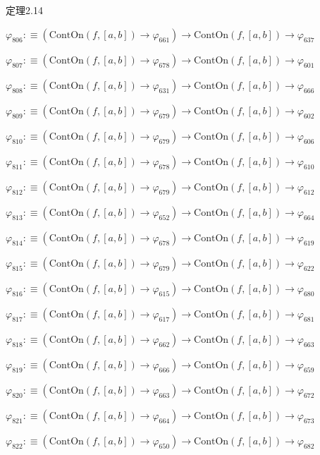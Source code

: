 \begin{fullproof}{定理2.14}
\begin{abbrevlist}
\item $\varphi_{806} :\equiv (\mathrm{ContOn}(f,[a,b]) \to \varphi_{661}) \to \mathrm{ContOn}(f,[a,b]) \to \varphi_{637}$
\item $\varphi_{807} :\equiv (\mathrm{ContOn}(f,[a,b]) \to \varphi_{678}) \to \mathrm{ContOn}(f,[a,b]) \to \varphi_{601}$
\item $\varphi_{808} :\equiv (\mathrm{ContOn}(f,[a,b]) \to \varphi_{631}) \to \mathrm{ContOn}(f,[a,b]) \to \varphi_{666}$
\item $\varphi_{809} :\equiv (\mathrm{ContOn}(f,[a,b]) \to \varphi_{679}) \to \mathrm{ContOn}(f,[a,b]) \to \varphi_{602}$
\item $\varphi_{810} :\equiv (\mathrm{ContOn}(f,[a,b]) \to \varphi_{679}) \to \mathrm{ContOn}(f,[a,b]) \to \varphi_{606}$
\item $\varphi_{811} :\equiv (\mathrm{ContOn}(f,[a,b]) \to \varphi_{678}) \to \mathrm{ContOn}(f,[a,b]) \to \varphi_{610}$
\item $\varphi_{812} :\equiv (\mathrm{ContOn}(f,[a,b]) \to \varphi_{679}) \to \mathrm{ContOn}(f,[a,b]) \to \varphi_{612}$
\item $\varphi_{813} :\equiv (\mathrm{ContOn}(f,[a,b]) \to \varphi_{652}) \to \mathrm{ContOn}(f,[a,b]) \to \varphi_{664}$
\item $\varphi_{814} :\equiv (\mathrm{ContOn}(f,[a,b]) \to \varphi_{678}) \to \mathrm{ContOn}(f,[a,b]) \to \varphi_{619}$
\item $\varphi_{815} :\equiv (\mathrm{ContOn}(f,[a,b]) \to \varphi_{679}) \to \mathrm{ContOn}(f,[a,b]) \to \varphi_{622}$
\item $\varphi_{816} :\equiv (\mathrm{ContOn}(f,[a,b]) \to \varphi_{615}) \to \mathrm{ContOn}(f,[a,b]) \to \varphi_{680}$
\item $\varphi_{817} :\equiv (\mathrm{ContOn}(f,[a,b]) \to \varphi_{617}) \to \mathrm{ContOn}(f,[a,b]) \to \varphi_{681}$
\item $\varphi_{818} :\equiv (\mathrm{ContOn}(f,[a,b]) \to \varphi_{662}) \to \mathrm{ContOn}(f,[a,b]) \to \varphi_{663}$
\item $\varphi_{819} :\equiv (\mathrm{ContOn}(f,[a,b]) \to \varphi_{666}) \to \mathrm{ContOn}(f,[a,b]) \to \varphi_{659}$
\item $\varphi_{820} :\equiv (\mathrm{ContOn}(f,[a,b]) \to \varphi_{663}) \to \mathrm{ContOn}(f,[a,b]) \to \varphi_{672}$
\item $\varphi_{821} :\equiv (\mathrm{ContOn}(f,[a,b]) \to \varphi_{664}) \to \mathrm{ContOn}(f,[a,b]) \to \varphi_{673}$
\item $\varphi_{822} :\equiv (\mathrm{ContOn}(f,[a,b]) \to \varphi_{650}) \to \mathrm{ContOn}(f,[a,b]) \to \varphi_{682}$

\end{abbrevlist}
\end{fullproof}
